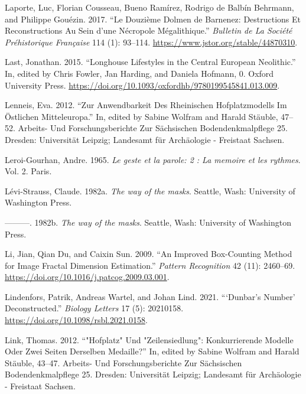 \documentclass[
  12pt,
  a4paper, twoside]{book}
\newlength{\cslhangindent}
\newlength{\cslentryspacingunit} %
\newenvironment{CSLReferences}[2] %
 {%
  \setlength{\parindent}{0pt}
  \ifodd #1
  \let\oldpar\par
  \def\par{\hangindent=\cslhangindent\oldpar}
  \fi
  \setlength{\parskip}{#2\cslentryspacingunit}
 }%
 {}
\begin{document}
\begin{CSLReferences}{1}{0}
\leavevmode{}%
Laporte, Luc, Florian Cousseau, Bueno Ramírez, Rodrigo de Balbín Behrmann, and Philippe Gouézin. 2017. {``Le Douzième Dolmen de Barnenez: Destructions Et Reconstructions Au Sein d'une Nécropole Mégalithique.''} \emph{Bulletin de La Société Préhistorique Française} 114 (1): 93--114. \url{https://www.jstor.org/stable/44870310}.

\leavevmode{}%
Last, Jonathan. 2015. {``Longhouse Lifestyles in the Central European Neolithic.''} In, edited by Chris Fowler, Jan Harding, and Daniela Hofmann, 0. Oxford University Press. \url{https://doi.org/10.1093/oxfordhb/9780199545841.013.009}.

\leavevmode{}%
Lenneis, Eva. 2012. {``Zur Anwendbarkeit Des Rheinischen Hofplatzmodells Im Östlichen Mitteleuropa.''} In, edited by Sabine Wolfram and Harald Stäuble, 47--52. Arbeits- Und Forschungsberichte Zur Sächsischen Bodendenkmalpflege 25. Dresden: Universität Leipzig; Landesamt für Archäologie - Freistaat Sachsen.

\leavevmode{}%
Leroi-Gourhan, Andre. 1965. \emph{Le geste et la parole: 2 : La memoire et les rythmes}. Vol. 2. Paris.

\leavevmode{}%
Lévi-Strauss, Claude. 1982a. \emph{The way of the masks}. Seattle, Wash: University of Washington Press.

\leavevmode{}%
---------. 1982b. \emph{The way of the masks}. Seattle, Wash: University of Washington Press.

\leavevmode{}%
Li, Jian, Qian Du, and Caixin Sun. 2009. {``An Improved Box-Counting Method for Image Fractal Dimension Estimation.''} \emph{Pattern Recognition} 42 (11): 2460--69. \url{https://doi.org/10.1016/j.patcog.2009.03.001}.

\leavevmode{}%
Lindenfors, Patrik, Andreas Wartel, and Johan Lind. 2021. {``{`}Dunbar's Number{'} Deconstructed.''} \emph{Biology Letters} 17 (5): 20210158. \url{https://doi.org/10.1098/rsbl.2021.0158}.

\leavevmode{}%
Link, Thomas. 2012. {``{"}Hofplatz{"} Und {"}Zeilensiedlung{"}: Konkurrierende Modelle Oder Zwei Seiten Derselben Medaille?''} In, edited by Sabine Wolfram and Harald Stäuble, 43--47. Arbeits- Und Forschungsberichte Zur Sächsischen Bodendenkmalpflege 25. Dresden: Universität Leipzig; Landesamt für Archäologie - Freistaat Sachsen.


\end{CSLReferences}
\end{document}
